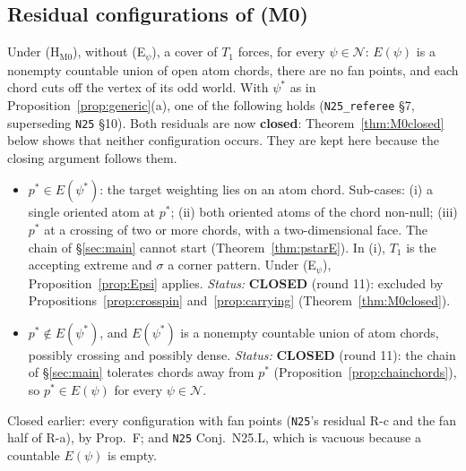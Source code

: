 \documentclass[11pt]{article}
\theoremstyle{definition}
\theoremstyle{remark}
\newcommand{\src}[1]{\texttt{#1}}
\begin{document}
\subsection{Residual configurations of (M0)}\label{sec:M0-residual}
Under (H$_{\mathrm{M0}}$), without (E$_\psi$), a cover of $T_1$ forces, for every $\psi\in\mathcal N$: $E(\psi)$ is a nonempty countable union of open atom chords, there are no fan points, and each chord cuts off the vertex of its odd world. With $\psi^*$ as in Proposition~\ref{prop:generic}(a), one of the following holds (\src{N25\_referee} \S7, superseding \src{N25} \S10). Both residuals are now \textbf{closed}: Theorem~\ref{thm:M0closed} below shows that neither configuration occurs. They are kept here because the closing argument follows them.
\begin{itemize}[leftmargin=*]
\item[\textbf{R-a$'$}] $p^*\in E(\psi^*)$: the target weighting lies on an atom chord. Sub-cases: (i) a single oriented atom at $p^*$; (ii) both oriented atoms of the chord non-null; (iii) $p^*$ at a crossing of two or more chords, with a two-dimensional face. The chain of \S\ref{sec:main} cannot start (Theorem~\ref{thm:pstarE}). In (i), $T_1$ is the accepting extreme and $\sigma$ a corner pattern. Under (E$_\psi$), Proposition~\ref{prop:Epsi} applies. \emph{Status:} \textbf{CLOSED} (round 11): excluded by Propositions~\ref{prop:crosspin} and~\ref{prop:carrying} (Theorem~\ref{thm:M0closed}).
\item[\textbf{R-b$'$}] $p^*\notin E(\psi^*)$, and $E(\psi^*)$ is a nonempty countable union of atom chords, possibly crossing and possibly dense. \emph{Status:} \textbf{CLOSED} (round 11): the chain of \S\ref{sec:main} tolerates chords away from $p^*$ (Proposition~\ref{prop:chainchords}), so $p^*\in E(\psi)$ for every $\psi\in\mathcal N$.
\end{itemize}
Closed earlier: every configuration with fan points (\src{N25}'s residual R-c and the fan half of R-a), by Prop.~F; and \src{N25} Conj.~N25.L, which is vacuous because a countable $E(\psi)$ is empty.
\end{document}
